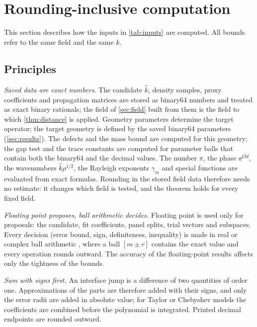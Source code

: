\section{Rounding-inclusive computation}\label{sm:reliable}
This section describes how the inputs in \cref{tab:inputs} are computed. All
bounds refer to the same field and the same $\widehat k$.

\subsection{Principles}\label{sm:principles}
\emph{Saved data are exact numbers.} The candidate $\widehat k$, density samples,
proxy coefficients and propagation matrices are stored as binary64 numbers and
treated as exact binary rationals; the field of \cref{sec:field} built from them
is the field to which \cref{thm:distance} is applied. Geometry parameters
determine the target operator; the target geometry is defined by the saved
binary64 parameters (\cref{sec:results}). The defects and the mass bound are
computed for this geometry; the gap test and the trace constants are computed for
parameter balls that contain both the binary64 and the decimal values. The
number $\pi$, the phase $\ee^{\ii\beta d}$, the wavenumbers $\widehat k\rho^{1/2}$, the Rayleigh
exponents $\gamma_m$ and special functions are evaluated from exact formulas.
Rounding in the stored field data therefore needs no estimate: it changes which
field is tested, and the theorem holds for every fixed field.

\emph{Floating point proposes, ball arithmetic decides.} Floating point is used
only for proposals: the candidate, fit coefficients, panel splits, trial vectors
and subspaces. Every decision (error bound, sign, definiteness, inequality) is
made in real or complex ball arithmetic \cite{Johansson2017}, where a ball
$[m\pm r]$ contains the exact value and every operation rounds outward. The
accuracy of the floating-point results affects only the tightness of the bounds.

\emph{Sum with signs first.} An interface jump is a difference of two quantities
of order one. Approximations of the parts are therefore added with their signs,
and only the error radii are added in absolute value; for Taylor or Chebyshev
models the coefficients are combined before the polynomial is integrated. Printed
decimal endpoints are rounded outward.

